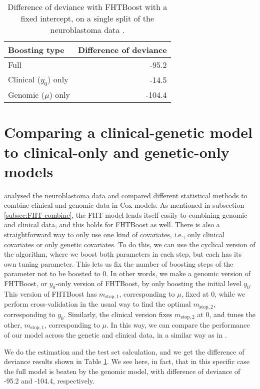 \begin{table}
\caption{Difference of deviance with FHTBoost with a fixed intercept, on a single split of the neuroblastoma data \citep{oberthuer-data}.}
\label{tab:deviances}
\centering
\begin{tabular}{lr}
\toprule
Boosting type & Difference of deviance \\
\hline
Full & -95.2 \\
Clinical ($y_0$) only  & -14.5 \\
Genomic ($\mu$) only & -104.4 \\
\bottomrule
\end{tabular}
\end{table}

\section{Comparing a clinical-genetic model to clinical-only and genetic-only models}
\citet{bovelstad2009} analysed the neuroblastoma data and compared different statistical methods to combine clinical and genomic data in Cox models.
As mentioned in subsection \ref{subsec:FHT-combine}, the FHT model lends itself easily to combining genomic and clinical data, and this holds for FHTBoost as well.
There is also a straightforward way to only use one kind of covariates, i.e., only clinical covariates or only genetic covariates.
To do this, we can use the cyclical version of the algorithm, where we boost both parameters in each step, but each has its own tuning parameter.
This lets us fix the number of boosting steps of the parameter not to be boosted to 0.
In other words, we make a genomic version of FHTBoost, or $y_0$-only version of FHTBoost, by only boosting the initial level $y_0$.
This version of FHTBoost has $m_{\text{stop},1}$, corresponding to $\mu$, fixed at 0, while we perform cross-validation in the usual way to find the optimal $m_{\text{stop},2}$, corresponding to $y_0$.
Similarly, the clinical version fixes $m_{\text{stop},2}$ at 0, and tunes the other, $m_{\text{stop},1}$, corresponding to $\mu$.
In this way, we can compare the performance of our model across the genetic and clinical data, in a similar way as in \citet{bovelstad2009}.

We do the estimation and the test set calculation, and we get the difference of deviance results shown in Table \ref{tab:deviances}.
We see here, in fact, that in this specific case the full model is beaten by the genomic model, with difference of deviance of -95.2 and -104.4, respectively.

